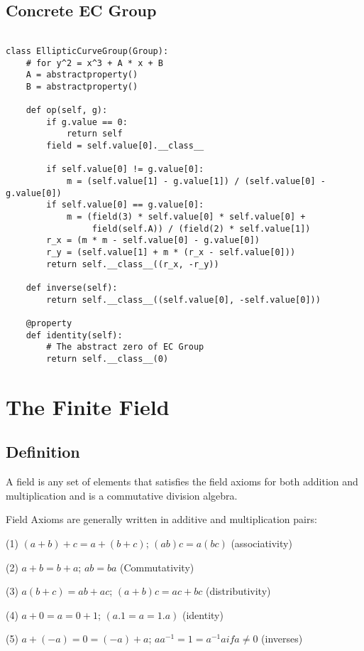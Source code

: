 \documentclass{article}
\begin{document}
\subsection{Concrete EC Group}
\begin{lstlisting}
  
class EllipticCurveGroup(Group):
    # for y^2 = x^3 + A * x + B
    A = abstractproperty()
    B = abstractproperty()

    def op(self, g):
        if g.value == 0:
            return self
        field = self.value[0].__class__

        if self.value[0] != g.value[0]:
            m = (self.value[1] - g.value[1]) / (self.value[0] - g.value[0])
        if self.value[0] == g.value[0]:
            m = (field(3) * self.value[0] * self.value[0] +
                 field(self.A)) / (field(2) * self.value[1])
        r_x = (m * m - self.value[0] - g.value[0])
        r_y = (self.value[1] + m * (r_x - self.value[0]))
        return self.__class__((r_x, -r_y))

    def inverse(self):
        return self.__class__((self.value[0], -self.value[0]))

    @property
    def identity(self):
        # The abstract zero of EC Group
        return self.__class__(0)

\end{lstlisting}

      

\section{The Finite Field}
\subsection{Definition}
A field is any set of elements that satisfies the field axioms for both addition and multiplication and is a commutative division algebra.

Field Axioms\cite{FieldAxioms} are generally written in additive and multiplication pairs:

(1) $(a+b)+c=a+(b+c)$; $(a b) c = a(b c)$ (associativity)

(2) $a + b = b + a$; $ a b = b a$ (Commutativity)

(3) $a(b+c) = ab + ac$; $(a+b)c=ac+bc$ (distributivity)

(4) $a + 0=a=0+1$; $(a.1=a=1.a)$ (identity)

(5) $a+(-a)=0=(-a)+a$; $aa^{-1}=1=a^{-1}a if a \neq 0$ (inverses)
\end{document}
